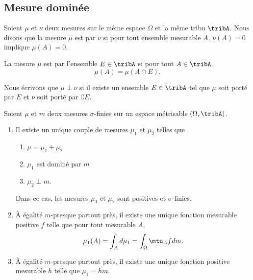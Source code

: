 \subsection{Mesure dominée}

Soient \( \mu\) et \( \nu\) deux mesures sur le même espace \( \Omega\) et la même tribu \( \tribA\). Nous disons que la mesure \( \mu\) est \cite{PersoFeng} par \( \nu\) si pour tout ensemble mesurable \( A\), \( \nu(A)=0\) implique \( \mu(A)=0\).

La mesure \( \mu\) est  par l'ensemble \( E\in\tribA\) si pour tout \( A\in\tribA\), 
\begin{equation}
    \mu(A)=\mu(A\cap E).
\end{equation}

Nous écrivons que \( \mu\perp\nu\) si il existe un ensemble \( E\in\tribA\) tel que \( \mu\) soit porté par \( E\) et \( \nu\) soit porté par \( \complement E\).

\begin{theorem}
    Soient \( \mu\) et \( m\) deux mesures \( \sigma\)-finies sur un espace métrisable \( (\Omega,\tribA)\).
    \begin{enumerate}
        \item
            Il existe un unique couple de mesures \( \mu_1\) et \( \mu_2\) telles que
            \begin{enumerate}
                \item
                    \( \mu=\mu_1+\mu_2\)
                \item
                    \( \mu_1\) est dominé par \( m\)
                \item
                    \( \mu_2\perp m\).
            \end{enumerate}
            Dans ce cas, les mesures \( \mu_1\) et \( \mu_2\) sont positives et \( \sigma\)-finies.
        \item
            À égalité \(  m\)-presque partout près, il existe une unique fonction mesurable positive \( f\) telle que pour tout mesurable \( A\),
            \begin{equation}
                \mu_1(A)=\int_Ad\mu_1=\int_{\Omega}\mtu_Afd m.
            \end{equation}
        \item
            À égalité \( m\)-presque partout près, il existe une unique fonction positive mesurable \( h\) telle que \( \mu_1=hm\).
    \end{enumerate}
\end{theorem}

